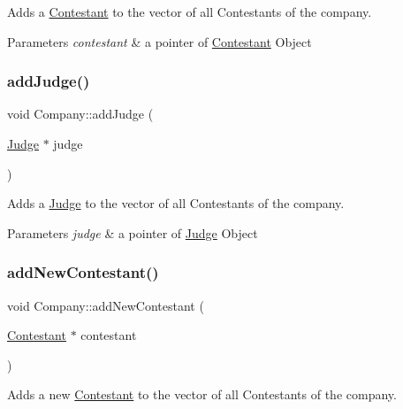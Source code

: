 Adds a \hyperlink{class_contestant}{Contestant} to the vector of all Contestants of the company. 


\begin{DoxyParams}{Parameters}
{\em contestant} & a pointer of \hyperlink{class_contestant}{Contestant} Object \\
\hline
\end{DoxyParams}
\mbox{\label{class_company_a349e0b6205c7dfe137e50cd35666448e}} 
\subsubsection{\texorpdfstring{add\+Judge()}{addJudge()}}
{\footnotesize\ttfamily void Company\+::add\+Judge (\begin{DoxyParamCaption}\item[{\hyperlink{class_judge}{Judge} $\ast$}]{judge }\end{DoxyParamCaption})}



Adds a \hyperlink{class_judge}{Judge} to the vector of all Contestants of the company. 


\begin{DoxyParams}{Parameters}
{\em judge} & a pointer of \hyperlink{class_judge}{Judge} Object \\
\hline
\end{DoxyParams}
\mbox{\label{class_company_a6784ebb8b31be1fcb5a1e5665b84c06c}} 
\subsubsection{\texorpdfstring{add\+New\+Contestant()}{addNewContestant()}}
{\footnotesize\ttfamily void Company\+::add\+New\+Contestant (\begin{DoxyParamCaption}\item[{\hyperlink{class_contestant}{Contestant} $\ast$}]{contestant }\end{DoxyParamCaption})}



Adds a new \hyperlink{class_contestant}{Contestant} to the vector of all Contestants of the company. 



